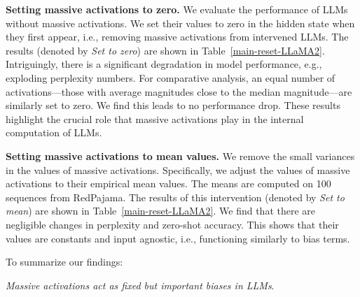 \documentclass[10pt]{article}
\theoremstyle{definition}
\theoremstyle{plain}
\begin{document}
\textbf{Setting massive activations to zero.} We evaluate the performance of LLMs without massive activations. We set their values to zero in the hidden state when they first appear, i.e., removing massive activations from intervened LLMs. The results (denoted by \textit{Set to zero}) are shown in Table~\ref{main-reset-LLaMA2}. Intriguingly, there is a significant degradation in model performance, e.g., exploding perplexity numbers. For comparative analysis, an equal number of activations---those with average magnitudes close to the median magnitude---are similarly set to zero. We find this leads to no performance drop. These results highlight the crucial role that massive activations play  in the internal computation of LLMs. 



\textbf{Setting massive activations to mean values.} We remove the small variances in the values of massive activations. Specifically, we adjust the values of massive activations to their empirical mean values. The means are computed on 100 sequences from RedPajama. The results of this intervention (denoted by \textit{Set to mean}) are shown in Table~\ref{main-reset-LLaMA2}. We find that there are negligible changes in perplexity and zero-shot accuracy. This shows that their values are constants and input agnostic, i.e., functioning similarly to bias terms.

To summarize our findings:
\begin{center}
    \textit{Massive activations act as fixed but important biases in LLMs}. 
\end{center}
\end{document}
